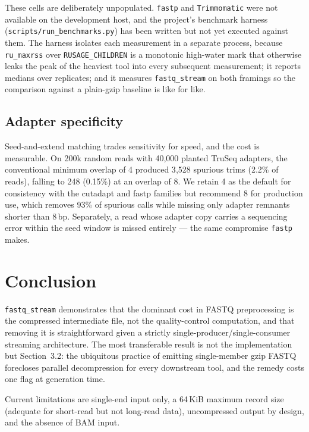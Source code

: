These cells are deliberately unpopulated. \texttt{fastp} and
\texttt{Trimmomatic} were not available on the development host, and the
project's benchmark harness (\texttt{scripts/run\_benchmarks.py}) has been
written but not yet executed against them. The harness isolates each
measurement in a separate process, because \texttt{ru\_maxrss} over
\texttt{RUSAGE\_CHILDREN} is a monotonic high-water mark that otherwise leaks
the peak of the heaviest tool into every subsequent measurement; it reports
medians over replicates; and it measures \texttt{fastq\_stream} on both
framings so the comparison against a plain-gzip baseline is like for like.

\subsection{Adapter specificity}

Seed-and-extend matching trades sensitivity for speed, and the cost is
measurable. On 200k random reads with 40{,}000 planted TruSeq adapters, the
conventional minimum overlap of 4 produced 3{,}528 spurious trims (2.2\% of
reads), falling to 248 (0.15\%) at an overlap of 8. We retain 4 as the default
for consistency with the cutadapt and fastp families but recommend 8 for
production use, which removes 93\% of spurious calls while missing only adapter
remnants shorter than 8\,bp. Separately, a read whose adapter copy carries a
sequencing error within the seed window is missed entirely --- the same
compromise \texttt{fastp} makes.

\section{Conclusion}

\texttt{fastq\_stream} demonstrates that the dominant cost in FASTQ
preprocessing is the compressed intermediate file, not the quality-control
computation, and that removing it is straightforward given a strictly
single-producer/single-consumer streaming architecture. The most transferable
result is not the implementation but Section~3.2: the ubiquitous practice of
emitting single-member gzip FASTQ forecloses parallel decompression for every
downstream tool, and the remedy costs one flag at generation time.

Current limitations are single-end input only, a 64\,KiB maximum record size
(adequate for short-read but not long-read data), uncompressed output by
design, and the absence of BAM input.

